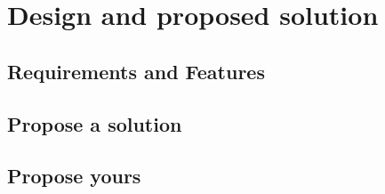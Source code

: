 

\chapter{Design and proposed solution}

\label{Chapter3} %


\section{Requirements and Features}


\section{Propose a solution}


\section{Propose yours}